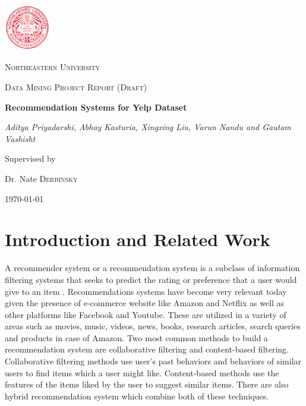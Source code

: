 \documentclass[11pt]{article}
\begin{document}
	\begin{titlepage}
		\centering
		\includegraphics[width=0.15\textwidth]{NU_logo.png}\par\vspace{1cm}
		{\scshape\LARGE Northeastern University \par}
		\vspace{1cm}
		{\scshape\Large Data Mining Project Report (Draft)\par}
		\vspace{1.5cm}
		{\huge\bfseries Recommendation Systems for Yelp Dataset\par}
		\vspace{2cm}
		{\Large\itshape Aditya Priyadarshi, Abhay Kasturia, Xingxing Liu, Varun Nandu and Gautam Vashisht \par}
		\vfill
		Supervised by\par
		Dr. Nate \textsc{Derbinsky}
		
		\vfill
		
		{\large \today\par}
	\end{titlepage}
	
	\section{Introduction and Related Work}
	A recommender system or a recommendation system is a subclass of information filtering systems that seeks to predict the rating or preference that a user would give to an item \cite{rsw}. Recommendations systems have become very relevant today given the presence of e-commerce website like Amazon and Netflix as well as other platforms like Facebook and Youtube. These are utilized in a variety of areas such as movies, music, videos, news, books, research articles, search queries and products in case of Amazon. Two most common methods to build a recommendation system are collaborative filtering and content-based filtering. Collaborative filtering methods use user's past behaviors and behaviors of similar users to find items which a user might like. Content-based methods use the features of the items liked by the user to suggest similar items. There are also hybrid recommendation system which combine both of these techniques.
	
\end{document}
